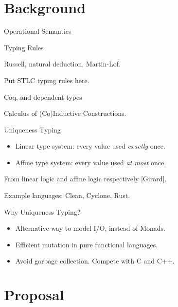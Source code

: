 \documentclass[10pt]{beamer}
\begin{document}
\section{Background}

\begin{frame}{Operational Semantics}

\end{frame}

\begin{frame}{Typing Rules}

Russell, natural deduction, Martin-Lof.

Put STLC typing rules here.

\end{frame}

\begin{frame}{Coq, and dependent types}

Calculus of (Co)Inductive Constructions.

\end{frame}

\begin{frame}{Uniqueness Typing}

\begin{itemize}
\item Linear type system: every value used \textit{exactly} once.
\item Affine type system: every value used \textit{at most} once.
\end{itemize}

From linear logic and affine logic respectively [Girard].

Example languages: Clean, Cyclone, Rust.

\end{frame}

\begin{frame}{Why Uniqueness Typing?}
\begin{itemize}
\item Alternative way to model I/O, instead of Monads.
\item Efficient mutation in pure functional languages.
\item Avoid garbage collection. Compete with C and C++.
\end{itemize}
\end{frame}

\section{Proposal}
\end{document}
